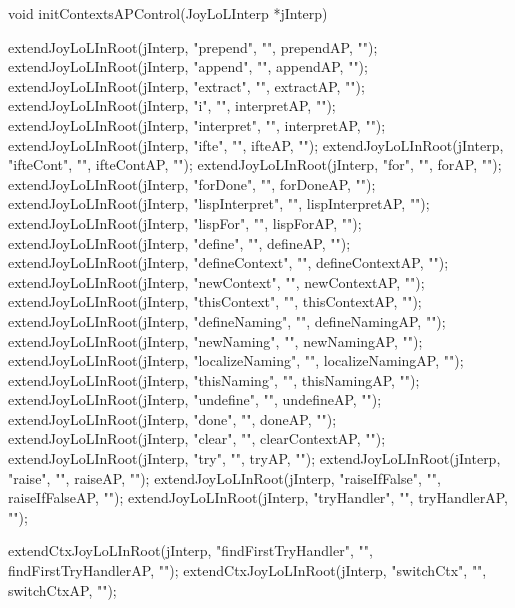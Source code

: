 \startCCode
void initContextsAPControl(JoyLoLInterp *jInterp) {
  extendJoyLoLInRoot(jInterp, "prepend",        "", prependAP,        "");
  extendJoyLoLInRoot(jInterp, "append",         "", appendAP,         "");
  extendJoyLoLInRoot(jInterp, "extract",        "", extractAP,        "");
  extendJoyLoLInRoot(jInterp, "i",              "", interpretAP,      "");
  extendJoyLoLInRoot(jInterp, "interpret",      "", interpretAP,      "");
  extendJoyLoLInRoot(jInterp, "ifte",           "", ifteAP,           "");
  extendJoyLoLInRoot(jInterp, "ifteCont",       "", ifteContAP,       "");
  extendJoyLoLInRoot(jInterp, "for",            "", forAP,            "");
  extendJoyLoLInRoot(jInterp, "forDone",        "", forDoneAP,        "");
  extendJoyLoLInRoot(jInterp, "lispInterpret",  "", lispInterpretAP,  "");
  extendJoyLoLInRoot(jInterp, "lispFor",        "", lispForAP,        "");
  extendJoyLoLInRoot(jInterp, "define",         "", defineAP,         "");
  extendJoyLoLInRoot(jInterp, "defineContext",  "", defineContextAP,  "");
  extendJoyLoLInRoot(jInterp, "newContext",     "", newContextAP,     "");
  extendJoyLoLInRoot(jInterp, "thisContext",    "", thisContextAP,    "");
  extendJoyLoLInRoot(jInterp, "defineNaming",   "", defineNamingAP,   "");
  extendJoyLoLInRoot(jInterp, "newNaming",      "", newNamingAP,      "");
  extendJoyLoLInRoot(jInterp, "localizeNaming", "", localizeNamingAP, "");
  extendJoyLoLInRoot(jInterp, "thisNaming",     "", thisNamingAP,     "");
  extendJoyLoLInRoot(jInterp, "undefine",       "", undefineAP,       "");
  extendJoyLoLInRoot(jInterp, "done",           "", doneAP,           "");
  extendJoyLoLInRoot(jInterp, "clear",          "", clearContextAP,   "");
  extendJoyLoLInRoot(jInterp, "try",            "", tryAP,            "");
  extendJoyLoLInRoot(jInterp, "raise",          "", raiseAP,          "");
  extendJoyLoLInRoot(jInterp, "raiseIfFalse",   "", raiseIfFalseAP,   "");
  extendJoyLoLInRoot(jInterp, "tryHandler",     "", tryHandlerAP,     "");
  
  extendCtxJoyLoLInRoot(jInterp, "findFirstTryHandler", "", findFirstTryHandlerAP, "");
  extendCtxJoyLoLInRoot(jInterp, "switchCtx",           "", switchCtxAP,           "");
}
\stopCCode